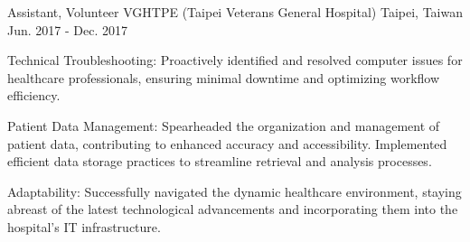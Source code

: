 

\begin{cventries}

  \cventry
    {Assistant, Volunteer} %
    {VGHTPE (Taipei Veterans General Hospital)} %
    {Taipei, Taiwan} %
    {Jun. 2017 - Dec. 2017} %
    {
      \begin{cvitems} %
        \item {Technical Troubleshooting: Proactively identified and resolved computer issues for healthcare professionals, ensuring minimal downtime and optimizing workflow efficiency.}
        \item {Patient Data Management: Spearheaded the organization and management of patient data, contributing to enhanced accuracy and accessibility. Implemented efficient data storage practices to streamline retrieval and analysis processes.}
        \item {Adaptability: Successfully navigated the dynamic healthcare environment, staying abreast of the latest technological advancements and incorporating them into the hospital’s IT infrastructure.}
      \end{cvitems}
    }


\end{cventries}
